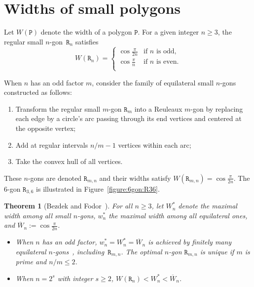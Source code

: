 \documentclass[a4paper,12pt]{article}
\theoremstyle{definition}
\theoremstyle{plain}
\newtheorem{theorem}{Theorem}
\newcommand{\ub}[1]{\overline{#1}}
\newcommand{\geo}[1]{\mathtt{#1}}
\begin{document}

\section{Widths of small polygons}\label{sec:ngon}
Let $W(\geo{P})$ denote the width of a polygon $\geo{P}$. For a given integer $n\ge 3$, the regular small $n$-gon~$\geo{R}_n$ satisfies
\[
W(\geo{R}_n) =
\begin{cases}
	\cos \frac{\pi}{2n} &\text{if $n$ is odd,}\\
	\cos \frac{\pi}{n} &\text{if $n$ is even.}\\
\end{cases}
\]

When $n$ has an odd factor $m$, consider the family of equilateral small $n$-gons constructed as follows:
\begin{enumerate}
	\item Transform the regular small $m$-gon  $\geo{R}_m$ into a Reuleaux $m$-gon by replacing each edge by a circle's arc passing through its end vertices and centered at the opposite vertex;
	\item Add at regular intervals $n/m-1$ vertices within each arc;
	\item Take the convex hull of all vertices.
\end{enumerate}
These $n$-gons are denoted $\geo{R}_{m,n}$ and their widths satisfy $W(\geo{R}_{m,n}) = \cos \frac{\pi}{2n}$. The $6$-gon $\geo{R}_{3,6}$ is illustrated in Figure~\ref{figure:6gon:R36}.

\begin{theorem}[Bezdek and Fodor~\cite{bezdek2000}]\label{thm:width}
	For all $n \ge 3$, let $W_n^*$ denote the maximal width among all small $n$-gons, $w_n^*$ the maximal width among all equilateral ones, and $\ub{W}_n := \cos \frac{\pi}{2n}$.
	\begin{itemize}
		\item When $n$ has an odd factor, $w_n^* = W_n^* = \ub{W}_n$ is achieved by finitely many equilateral $n$-gons~\cite{mossinghoff2011,hare2013,hare2019}, including~$\geo{R}_{m,n}$. The optimal $n$-gon $\geo{R}_{m,n}$ is unique if $m$ is prime and $n/m \le 2$.
		\item When $n=2^s$ with integer $s\ge 2$, $W(\geo{R}_n) <  W_n^* < \ub{W}_n$.
	\end{itemize}
\end{theorem}
\end{document}
